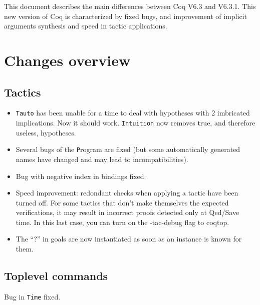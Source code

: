 \documentclass[11pt]{article}
\begin{document}

This document describes the main differences between Coq V6.3 and
V6.3.1. This new version of Coq is characterized by fixed bugs, and
improvement of implicit arguments synthesis and speed in tactic
applications.

\section{Changes overview}

\subsection{Tactics}

  \begin{itemize}

  \item \texttt {Tauto} has been unable for a time to deal with
hypotheses with 2 imbricated implications. Now it should work.
\texttt {Intuition} now removes true, and therefore useless,
hypotheses.\\

  \item Several bugs of the {\texttt Program} are fixed (but some
  automatically generated names have changed and may lead to
  incompatibilities).

  \item Bug with negative index in bindings fixed.

  \item Speed improvement: redondant checks when applying a tactic
  have been turned off. For some tactics that don't make themselves
  the expected verifications, it may result in incorrect proofs
  detected only at Qed/Save time. In this last case, you can turn on
  the -tac-debug flag to coqtop.

  \item The ``?'' in goals are now instantiated as soon as an instance
  is known for them.

  \end{itemize}

\subsection{Toplevel commands}

\begin{description}
    
\item Bug in \texttt{Time} fixed.

\end{description}
    
\end{document}

